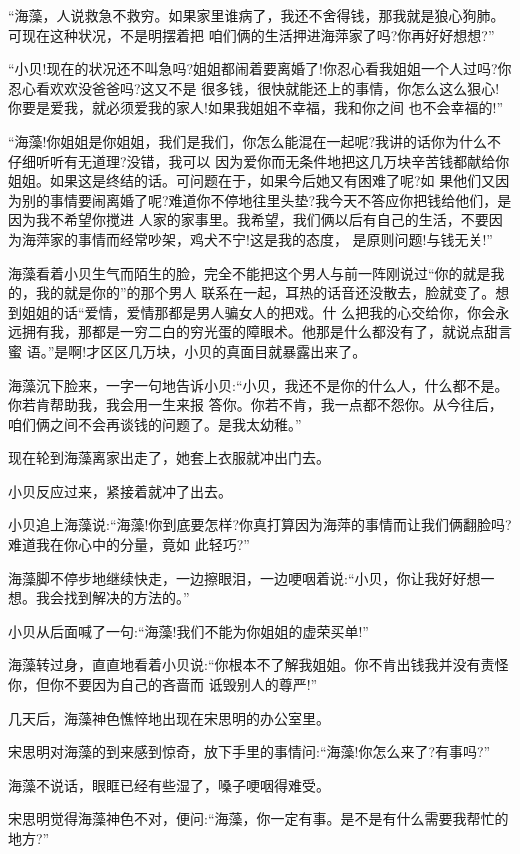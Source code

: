 \documentclass[11pt,a4paper,onecolumn]{article}
\begin{document}
``海藻，人说救急不救穷。如果家里谁病了，我还不舍得钱，那我就是狼心狗肺。可现在这种状况，不是明摆着把
咱们俩的生活押进海萍家了吗?你再好好想想?''

``小贝!现在的状况还不叫急吗?姐姐都闹着要离婚了!你忍心看我姐姐一个人过吗?你忍心看欢欢没爸爸吗?这又不是
很多钱，很快就能还上的事情，你怎么这么狠心!你要是爱我，就必须爱我的家人!如果我姐姐不幸福，我和你之间
也不会幸福的!''

``海藻!你姐姐是你姐姐，我们是我们，你怎么能混在一起呢?我讲的话你为什么不仔细听听有无道理?没错，我可以
因为爱你而无条件地把这几万块辛苦钱都献给你姐姐。如果这是终结的话。可问题在于，如果今后她又有困难了呢?如
果他们又因为别的事情要闹离婚了呢?难道你不停地往里头垫?我今天不答应你把钱给他们，是因为我不希望你搅进
人家的家事里。我希望，我们俩以后有自己的生活，不要因为海萍家的事情而经常吵架，鸡犬不宁!这是我的态度，
是原则问题!与钱无关!''

海藻看着小贝生气而陌生的脸，完全不能把这个男人与前一阵刚说过``你的就是我的，我的就是你的''的那个男人
联系在一起，耳热的话音还没散去，脸就变了。想到姐姐的话\myrule ``爱情，爱情那都是男人骗女人的把戏。什
么把我的心交给你，你会永远拥有我，那都是一穷二白的穷光蛋的障眼术。他那是什么都没有了，就说点甜言蜜
语。''是啊!才区区几万块，小贝的真面目就暴露出来了。

海藻沉下脸来，一字一句地告诉小贝:``小贝，我还不是你的什么人，什么都不是。你若肯帮助我，我会用一生来报
答你。你若不肯，我一点都不怨你。从今往后，咱们俩之间不会再谈钱的问题了。是我太幼稚。''

现在轮到海藻离家出走了，她套上衣服就冲出门去。

小贝反应过来，紧接着就冲了出去。

小贝追上海藻说:``海藻!你到底要怎样?你真打算因为海萍的事情而让我们俩翻脸吗?难道我在你心中的分量，竟如
此轻巧?''

海藻脚不停步地继续快走，一边擦眼泪，一边哽咽着说:``小贝，你让我好好想一想。我会找到解决的方法的。''

小贝从后面喊了一句:``海藻!我们不能为你姐姐的虚荣买单!''

海藻转过身，直直地看着小贝说:``你根本不了解我姐姐。你不肯出钱我并没有责怪你，但你不要因为自己的吝啬而
诋毁别人的尊严!''

几天后，海藻神色憔悴地出现在宋思明的办公室里。

宋思明对海藻的到来感到惊奇，放下手里的事情问:``海藻!你怎么来了?有事吗?''

海藻不说话，眼眶已经有些湿了，嗓子哽咽得难受。

宋思明觉得海藻神色不对，便问:``海藻，你一定有事。是不是有什么需要我帮忙的地方?''
\end{document}
